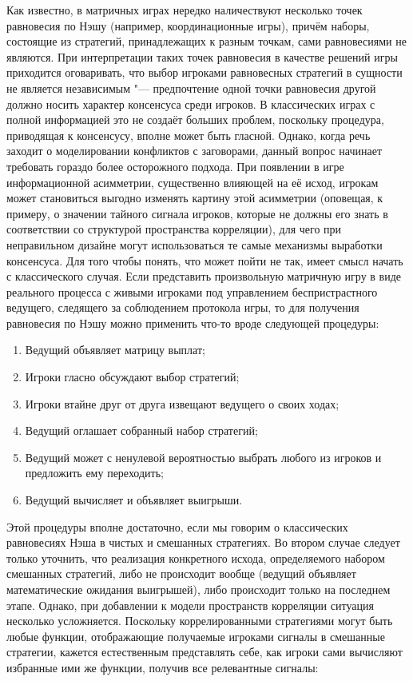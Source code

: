 Как известно, в матричных играх нередко наличествуют несколько точек равновесия по Нэшу (например, координационные игры), причём наборы, состоящие из стратегий, принадлежащих к разным точкам, сами равновесиями не являются. При интерпретации таких точек равновесия в качестве решений игры приходится оговаривать, что выбор игроками равновесных стратегий в сущности не является независимым "--- предпочтение одной точки равновесия другой должно носить характер консенсуса среди игроков. В классических играх с полной информацией это не создаёт больших проблем, поскольку процедура, приводящая к консенсусу, вполне может быть гласной. Однако, когда речь заходит о моделировании конфликтов с заговорами, данный вопрос начинает требовать гораздо более осторожного подхода. При появлении в игре информационной асимметрии, существенно влияющей на её исход, игрокам может становиться выгодно изменять картину этой асимметрии (оповещая, к примеру, о значении тайного сигнала игроков, которые не должны его знать в соответствии со структурой пространства корреляции), для чего при неправильном дизайне могут использоваться те самые механизмы выработки консенсуса. Для того чтобы понять, что может пойти не так, имеет смысл начать с классического случая. Если представить произвольную матричную игру в виде реального процесса с живыми игроками под управлением беспристрастного ведущего, следящего за соблюдением протокола игры, то для получения равновесия по Нэшу можно применить что-то вроде следующей процедуры:

\begin{enumerate}
	\item Ведущий объявляет матрицу выплат;
	\item Игроки гласно обсуждают выбор стратегий;
	\item Игроки втайне друг от друга извещают ведущего о своих ходах;
	\item Ведущий оглашает собранный набор стратегий;
	\item Ведущий может с ненулевой вероятностью выбрать любого из игроков и предложить ему переходить;
	\item Ведущий вычисляет и объявляет выигрыши.
\end{enumerate}

Этой процедуры вполне достаточно, если мы говорим о классических равновесиях Нэша в чистых и смешанных стратегиях. Во втором случае следует только уточнить, что реализация конкретного исхода, определяемого набором смешанных стратегий, либо не происходит вообще (ведущий объявляет математические ожидания выигрышей), либо происходит только на последнем этапе. Однако, при добавлении к модели пространств корреляции ситуация несколько усложняется. Поскольку коррелированными стратегиями могут быть любые функции, отображающие получаемые игроками сигналы в смешанные стратегии, кажется естественным представлять себе, как игроки сами вычисляют избранные ими же функции, получив все релевантные сигналы:


